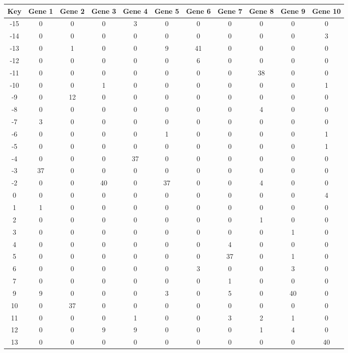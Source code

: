 \begin{tabular}{|c|c|c|c|c|c|c|c|c|c|c|}
\hline
Key & Gene 1 & Gene 2 & Gene 3 & Gene 4 & Gene 5 & Gene 6 & Gene 7 & Gene 8 & Gene 9 & Gene 10 \\
\hline
-15 & 0 & 0 & 0 & 3 & 0 & 0 & 0 & 0 & 0 & 0 \\
-14 & 0 & 0 & 0 & 0 & 0 & 0 & 0 & 0 & 0 & 3 \\
-13 & 0 & 1 & 0 & 0 & 9 & 41 & 0 & 0 & 0 & 0 \\
-12 & 0 & 0 & 0 & 0 & 0 & 6 & 0 & 0 & 0 & 0 \\
-11 & 0 & 0 & 0 & 0 & 0 & 0 & 0 & 38 & 0 & 0 \\
-10 & 0 & 0 & 1 & 0 & 0 & 0 & 0 & 0 & 0 & 1 \\
-9 & 0 & 12 & 0 & 0 & 0 & 0 & 0 & 0 & 0 & 0 \\
-8 & 0 & 0 & 0 & 0 & 0 & 0 & 0 & 4 & 0 & 0 \\
-7 & 3 & 0 & 0 & 0 & 0 & 0 & 0 & 0 & 0 & 0 \\
-6 & 0 & 0 & 0 & 0 & 1 & 0 & 0 & 0 & 0 & 1 \\
-5 & 0 & 0 & 0 & 0 & 0 & 0 & 0 & 0 & 0 & 1 \\
-4 & 0 & 0 & 0 & 37 & 0 & 0 & 0 & 0 & 0 & 0 \\
-3 & 37 & 0 & 0 & 0 & 0 & 0 & 0 & 0 & 0 & 0 \\
-2 & 0 & 0 & 40 & 0 & 37 & 0 & 0 & 4 & 0 & 0 \\
0 & 0 & 0 & 0 & 0 & 0 & 0 & 0 & 0 & 0 & 4 \\
1 & 1 & 0 & 0 & 0 & 0 & 0 & 0 & 0 & 0 & 0 \\
2 & 0 & 0 & 0 & 0 & 0 & 0 & 0 & 1 & 0 & 0 \\
3 & 0 & 0 & 0 & 0 & 0 & 0 & 0 & 0 & 1 & 0 \\
4 & 0 & 0 & 0 & 0 & 0 & 0 & 4 & 0 & 0 & 0 \\
5 & 0 & 0 & 0 & 0 & 0 & 0 & 37 & 0 & 1 & 0 \\
6 & 0 & 0 & 0 & 0 & 0 & 3 & 0 & 0 & 3 & 0 \\
7 & 0 & 0 & 0 & 0 & 0 & 0 & 1 & 0 & 0 & 0 \\
9 & 9 & 0 & 0 & 0 & 3 & 0 & 5 & 0 & 40 & 0 \\
10 & 0 & 37 & 0 & 0 & 0 & 0 & 0 & 0 & 0 & 0 \\
11 & 0 & 0 & 0 & 1 & 0 & 0 & 3 & 2 & 1 & 0 \\
12 & 0 & 0 & 9 & 9 & 0 & 0 & 0 & 1 & 4 & 0 \\
13 & 0 & 0 & 0 & 0 & 0 & 0 & 0 & 0 & 0 & 40 \\
\hline
\end{tabular}